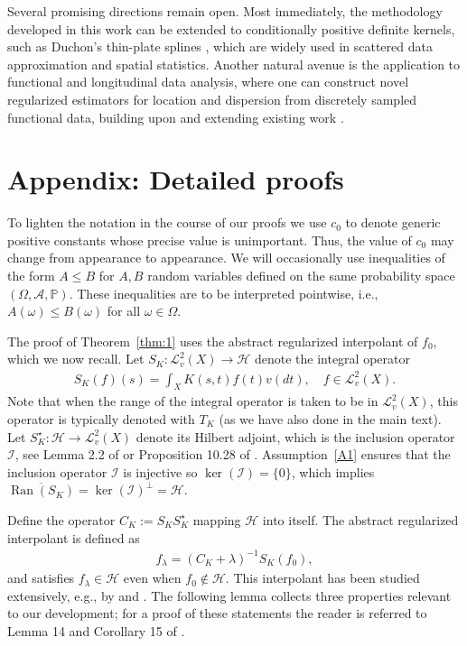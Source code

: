 \documentclass[11pt]{article}
\theoremstyle{definition}
\theoremstyle{remark}
\DeclareMathOperator{\Ran}{Ran}
\begin{document}
Several promising directions remain open. Most immediately, the methodology developed in this work can be extended to conditionally positive definite kernels, such as Duchon's thin-plate splines \citep{Duchon:1977}, which are widely used in scattered data approximation and spatial statistics. Another natural avenue is the application to functional and longitudinal data analysis, where one can construct novel regularized estimators for location and dispersion from discretely sampled functional data, building upon and extending existing work \citep[e.g.,][]{Kal:2023}. 





\section{Appendix: Detailed proofs}

To lighten the notation in the course of our proofs we use $c_0$ to denote generic positive constants whose precise value is unimportant. Thus, the value of $c_0$ may change from appearance to appearance. We will occasionally use inequalities of the form $A \leq B$ for $A, B$ random variables defined on the same probability space $(\Omega,\mathcal{A},\mathbb{P})$. These inequalities are to be interpreted pointwise, i.e., $A(\omega) \leq B(\omega)$ for all $\omega \in \Omega$.

The proof of Theorem~\ref{thm:1} uses the abstract regularized interpolant of $f_0$, which we now recall. Let $S_K: \mathcal{L}^2_v(X) \to \mathcal{H}$ denote the integral operator 
\begin{align*}
S_K(f) (s) = \int_{X} K(s,t) f(t) v(dt), \quad f \in \mathcal{L}^2_v(X).
\end{align*}
Note that when the range of the integral operator is taken to be in $\mathcal{L}^2_v(X)$, this operator is typically denoted with $T_K$ (as we have also done in the main text). Let $S_K^{\star}: \mathcal{H} \to \mathcal{L}^2_v(X)$ denote its Hilbert adjoint, which is the inclusion operator $\mathcal{I}$, see Lemma 2.2 of \citep{St:2012} or Proposition 10.28 of \citep{Wend:2005}. Assumption~\ref{A1} ensures that the inclusion operator $\mathcal{I}$ is injective so $\ker(\mathcal{I}) = \{0\}$, which implies $\overline{\Ran(S_K)} = \ker(\mathcal{I})^{\perp} = \mathcal{H}$.

Define the operator $C_K := S_K S_K^{\star}$ mapping $\mathcal{H}$ into itself. The abstract regularized interpolant is defined as
\begin{align*}
f_{\lambda} = (C_K+\lambda)^{-1} S_K(f_0),
\end{align*}
and satisfies $f_{\lambda} \in \mathcal{H}$ even when $f_0 \notin \mathcal{H}$.
This interpolant has been studied extensively, e.g., by \citet{Smale:2005} and \citet{Fischer:2020}. The following lemma collects three properties relevant to our development; for a proof of these statements the reader is referred to Lemma 14 and Corollary 15 of \citep{Fischer:2020}.
\end{document}
